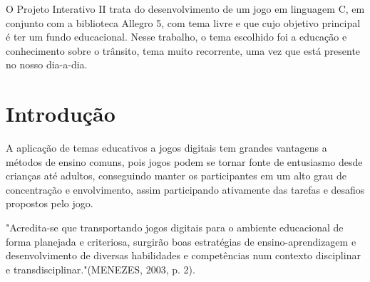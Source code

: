 \documentclass[
	article,			%
	11pt,				%
	oneside,			%
	a4paper,			%
	english,			%
	brazil,				%
	]{abntex2}
\begin{document}
\frenchspacing 


%
%
\maketitle

\begin{resumoumacoluna}

O Projeto Interativo II trata do desenvolvimento de um jogo em linguagem C, em conjunto com a biblioteca
Allegro 5, com tema livre e que 
cujo objetivo principal é ter um fundo educacional.
Nesse trabalho, o tema escolhido foi a educação e conhecimento sobre o trânsito,
tema muito recorrente, uma vez que está presente no nosso dia-a-dia.\\
 
 \vspace{\onelineskip}
 
\end{resumoumacoluna}


\textual

\section*{Introdução}

A aplicação de temas educativos a jogos digitais tem grandes vantagens a métodos de ensino comuns, pois
jogos podem se tornar fonte de entusiasmo desde crianças até adultos, conseguindo manter os participantes
em um alto grau de concentração e envolvimento, assim participando ativamente das tarefas e desafios 
propostos pelo jogo.

"Acredita-se que transportando jogos digitais para o ambiente educacional de forma planejada e
criteriosa, surgirão boas estratégias de ensino-aprendizagem e desenvolvimento de diversas
habilidades e competências num contexto disciplinar e transdisciplinar."(MENEZES, 2003, 
p. 2). 
\end{document}
